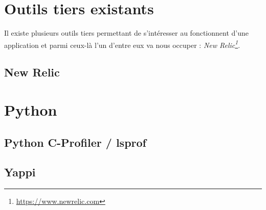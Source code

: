 		\section{Outils tiers existants}
Il existe plusieurs outils tiers permettant de s'intéresser au fonctionnent d'une application \Python et parmi ceux-là l'un d'entre eux va nous occuper : \emph{New Relic\footnote{\url{https://www.newrelic.com}}}. %

			\subsection{New Relic}
          		
			
		\section{Python}
			\subsection{Python C-Profiler / \textunderscore lsprof} 
			\label{subsec:cprofiler}
				
			\subsection{Yappi}
			\label{subsec:yappi}
				
				
				
				
				
				
				
				
				
				
				
				
				
				
				
				
				
				
				
				
				
				
				
				
				
				
				
				
				
				
				
				
				
				